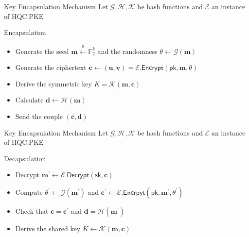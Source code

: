 \begin{frame}{Key Encapsulation Mechanism}
    Let $\mathcal{G, H, K}$ be hash functions and $\mathcal{E}$ an instance of \textsf{HQC.PKE}
    \begin{block}{Encapsulation}
        \begin{itemize}
            \item Generate the seed $\mathbf{m} \xleftarrow{\$} \mathds{F}_2^k$ and the randomness $\theta \leftarrow \mathcal{G}(\mathbf{m})$
            \item Generate the ciphertext $\mathbf{c} \leftarrow (\mathbf{u, v}) = \mathcal{E}.\textsf{Encrypt}(\textsf{pk}, \mathbf{m}, \theta)$
            \item Derive the symmetric key $K = \mathcal{K}(\mathbf{m, c})$
            \item Calculate $\mathbf{d} \leftarrow \mathcal{H}(\mathbf{m})$
            \item Send the couple $(\mathbf{c, d})$
        \end{itemize}
    \end{block}
\end{frame}

\begin{frame}{Key Encapsulation Mechanism}
    Let $\mathcal{G, H, K}$ be hash functions and $\mathcal{E}$ an instance of \textsf{HQC.PKE}
    \begin{block}{Decapsulation}
        \begin{itemize}
            \item Decrypt $\mathbf{m}^{'} \leftarrow \mathcal{E}.\textsf{Decrypt}(\textsf{sk}, \mathbf{c})$
            \item Compute $\theta^{'} \leftarrow \mathcal{G}(\mathbf{m}^{'})$ and $\mathbf{c}^{'} \leftarrow \mathcal{E}.\textsf{Encrpyt}(\textsf{pk}, \mathbf{m}^{'}, \theta^{'})$
            \item Check that $\mathbf{c = c^{'}}$ and $\mathbf{d} = \mathcal{H}(\mathbf{m}^{'})$
            \item Derive the shared key $K \leftarrow \mathcal{K}(\mathbf{m, c})$
        \end{itemize}
    \end{block}
\end{frame}
